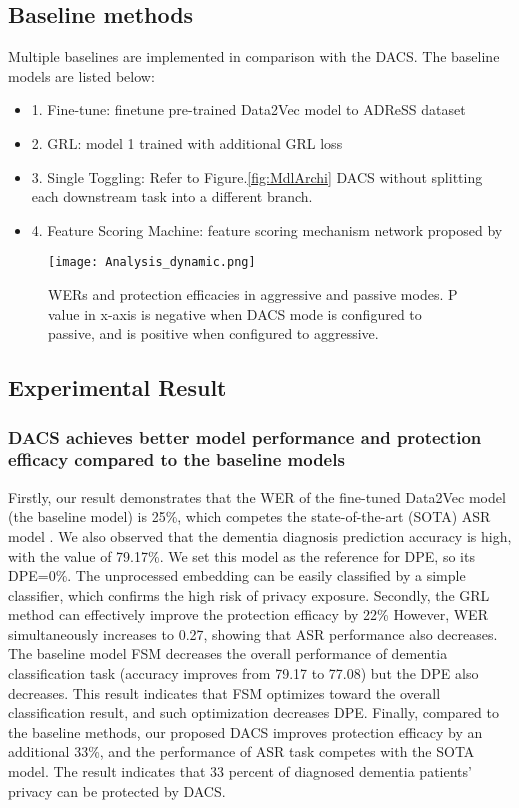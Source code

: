 \documentclass[lettersize,journal]{IEEEtran}
\begin{document}
\subsection{Baseline methods}
Multiple baselines are implemented in comparison with the DACS. The baseline models are listed below:
\begin{itemize}
\item 1. Fine-tune: finetune pre-trained Data2Vec model to ADReSS dataset
\item 2. GRL: model 1 trained with additional GRL loss
\item 3. Single Toggling: Refer to Figure.\ref{fig:MdlArchi} DACS without splitting each downstream task into a different branch.
\item 4. Feature Scoring Machine: feature scoring mechanism network proposed by \cite{huang2022attention}
\end{itemize}

\begin{figure}
\centerline{\texttt{[image: Analysis\_dynamic.png]}}
\caption{WERs and protection efficacies in aggressive and passive modes. P value in x-axis is negative when DACS mode is configured to passive, and is positive when configured to aggressive.}
\label{fig:AnalStat}
\end{figure}



\subsection{Experimental Result}
\label{ssec:result}
\subsubsection{DACS achieves better model performance and protection efficacy compared to the baseline models}
\label{ssec:DSCNbest}
Firstly, our result demonstrates that the WER of the fine-tuned Data2Vec model (the baseline model) is 25\%, which competes the state-of-the-art (SOTA) ASR model \cite{pan2020improving}. We also observed that the dementia diagnosis prediction accuracy is high, with the value of 79.17\%. We set this model as the reference for DPE, so its DPE=0\%. The unprocessed embedding can be easily classified by a simple classifier, which confirms the high risk of privacy exposure. Secondly, the GRL method can effectively improve the protection efficacy by 22\% However, WER simultaneously increases to 0.27, showing that ASR performance also decreases. The baseline model FSM decreases the overall performance of dementia classification task (accuracy improves from 79.17 to 77.08) but the DPE also decreases. This result indicates that FSM optimizes toward the overall classification result, and such optimization decreases DPE. Finally, compared to the baseline methods, our proposed DACS improves protection efficacy by an additional 33\%, and the performance of ASR task competes with the SOTA model. The result indicates that 33 percent of diagnosed dementia patients' privacy can be protected by DACS.
\end{document}
